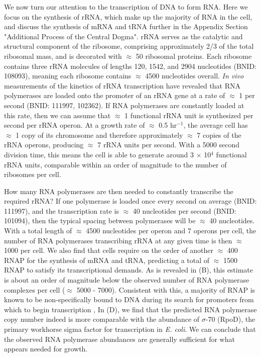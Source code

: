 We now turn our attention to the transcription of DNA to form RNA. Here we focus
on the synthesis of rRNA, which make up the majority of RNA in the cell, and
discuss the synthesis of mRNA and tRNA further in the Appendix Section
"Additional Process of the Central Dogma". rRNA serves as the catalytic and
structural component of the ribosome, comprising approximately 2/3 of the total
ribosomal mass, and is decorated with $\approx$ 50 ribosomal proteins. Each
ribosome contains three rRNA molecules of lengths 120, 1542, and 2904
nucleotides (BNID: 108093), meaning each ribosome contains $\approx$ 4500
nucleotides overall. \textit{In vivo} measurements of the kinetics of rRNA
transcription have revealed that RNA polymerases are loaded onto the promoter of
an rRNA gene at a rate of $\approx$ 1 per second (BNID: 111997, 102362). If RNA
polymerases are constantly loaded at this rate, then we can assume that
$\approx$ 1 functional rRNA unit is synthesized per second per rRNA operon.  At
a growth rate of $\approx$ 0.5 hr$^{-1}$, the average cell has $\approx$ 1 copy
of its chromosome and therefore approximately $\approx$ 7 copies of the rRNA
operons, producing $\approx$ 7 rRNA units per second. With a 5000 second
division time, this means the cell is able to generate around 3 $\times$ 10$^4$
functional rRNA units, comparable within an order of magnitude to the number of
ribosomes per cell.

How many RNA polymerases are then needed to constantly transcribe the required
rRNA? If one polymerase is loaded once every second on average (BNID: 111997),
and the transcription rate is $\approx$ 40 nucleotides per second (BNID:
101094), then the typical spacing between polymerases will be $\approx$ 40
nucleotides. With a total length of $\approx$ 4500 nucleotides per operon and 7
operons per cell, the number of RNA polymerases transcribing rRNA at any given
time is then $\approx$ 1000 per cell. We also find that cells require on the
order of another $\approx$ 400 RNAP for the  synthesis of mRNA and tRNA,
predicting a total of  $\approx$ 1500 RNAP to satisfy its transcriptional
demands. As is revealed in (B), this estimate is about an
order of magnitude below the observed number of RNA polymerase complexes per
cell ($\approx$ 5000 - 7000). Consistent with this, a majority of RNAP is known
to be  non-specifically bound to DNA during its search for promoters from which
to begin transcription \citep{klumpp2008, patrick2015},  In
(D), we find that the predicted RNA polymerase copy number
indeed is more comparable with the abundance of $\sigma$-70 (RpoD), the primary
workhorse sigma factor for transcription in \textit{E. coli}. We can conclude
that the observed RNA polymerase abundances are generally sufficient for what
appears needed for growth.


